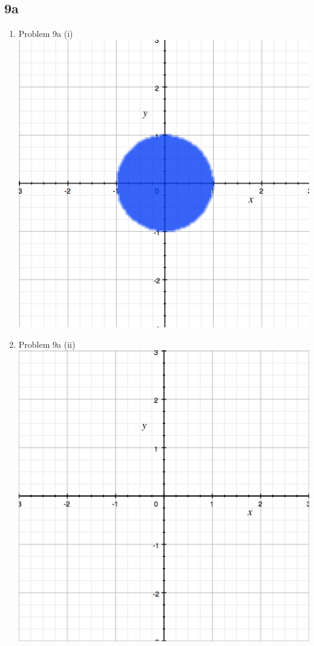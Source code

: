 \documentclass[11pt]{article}
\newcommand{\solution}[1]{{{\color{blue}{\bf Solution:} {#1}}}}
\begin{document}
\subsection{9a}
\begin{enumerate}
\item Problem 9a (i) 
\solution{}
\newline
\includegraphics[scale=0.4]{9a(i)}

\item Problem 9a (ii)
\solution{}
\newline
\includegraphics[scale=0.4]{9a(ii)}


\end{enumerate}
\end{document}
